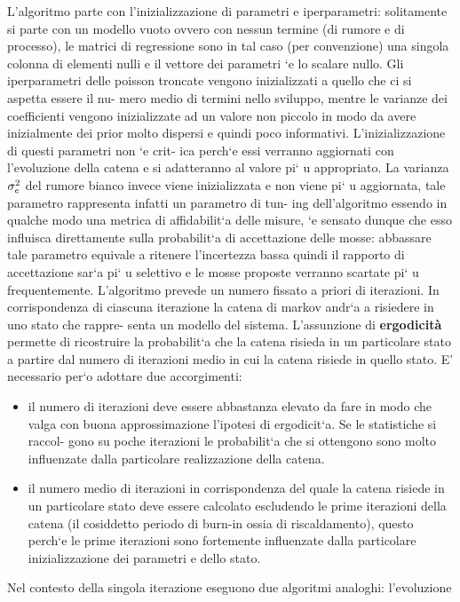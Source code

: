 L’algoritmo parte con l’inizializzazione di parametri e iperparametri: solitamente si
parte con un modello vuoto ovvero con nessun termine (di rumore e di processo),
le matrici di regressione sono in tal caso (per convenzione) una singola colonna
di elementi nulli e il vettore dei parametri `e lo scalare nullo. Gli iperparametri
delle poisson troncate vengono inizializzati a quello che ci si aspetta essere il nu-
mero medio di termini nello sviluppo, mentre le varianze dei coefficienti vengono
inizializzate ad un valore non piccolo in modo da avere inizialmente dei prior molto
dispersi e quindi poco informativi. L’inizializzazione di questi parametri non `e crit-
ica perch`e essi verranno aggiornati con l’evoluzione della catena e si adatteranno al
valore pi`
u appropriato. La varianza $\sigma_e^2$ del rumore bianco invece viene inizializzata
e non viene pi`
u aggiornata, tale parametro rappresenta infatti un parametro di tun-
ing dell’algoritmo essendo in qualche modo una metrica di affidabilit`a delle misure,
`e sensato dunque che esso influisca direttamente sulla probabilit`a di accettazione
delle mosse: abbassare tale parametro equivale a ritenere l’incertezza bassa quindi
il rapporto di accettazione sar`a pi`
u selettivo e le mosse proposte verranno scartate
pi`
u frequentemente.
L’algoritmo prevede un numero fissato a priori di iterazioni. In corrispondenza di
ciascuna iterazione la catena di markov andr`a a risiedere in uno stato che rappre-
senta un modello del sistema. L’assunzione di \textbf{ergodicità} permette di ricostruire la probabilit`a che la catena risieda in un particolare stato a partire dal
numero di iterazioni medio in cui la catena risiede in quello stato. E’ necessario per`o
adottare due accorgimenti:
\begin{itemize}
\item il numero di iterazioni deve essere abbastanza elevato da fare in modo che valga
con buona approssimazione l’ipotesi di ergodicit`a. Se le statistiche si raccol-
gono su poche iterazioni le probabilit`a che si ottengono sono molto influenzate
dalla particolare realizzazione della catena.
\item il numero medio di iterazioni in corrispondenza del quale la catena risiede in
un particolare stato deve essere calcolato escludendo le prime iterazioni della
catena (il cosiddetto periodo di burn-in ossia di riscaldamento), questo perch`e
le prime iterazioni sono fortemente influenzate dalla particolare inizializzazione
dei parametri e dello stato.
\end{itemize}
Nel contesto della singola iterazione eseguono due algoritmi analoghi: l’evoluzione
